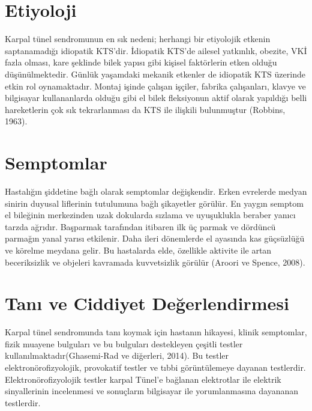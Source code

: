 \documentclass[12pt,twoside]{deuthesis}
\begin{document}
\hypertarget{KTSEtiyoloji}{%
\section{Etiyoloji}\label{KTSEtiyoloji}}

Karpal tünel sendromunun en sık nedeni; herhangi bir etiyolojik etkenin saptanamadığı idiopatik KTS'dir. İdiopatik KTS'de ailesel yatkınlık, obezite, VKİ fazla olması, kare şeklinde bilek yapısı gibi
kişisel faktörlerin etken olduğu düşünülmektedir. Günlük yaşamdaki mekanik etkenler de idiopatik KTS
üzerinde etkin rol oynamaktadır. Montaj işinde çalışan işçiler, fabrika çalışanları, klavye ve bilgisayar
kullananlarda olduğu gibi el bilek fleksiyonun aktif olarak yapıldığı belli hareketlerin çok sık
tekrarlanması da KTS ile ilişkili bulunmuştur (Robbins, 1963).

\hypertarget{KTSSemptom}{%
\section{Semptomlar}\label{KTSSemptom}}

Hastalığın şiddetine bağlı olarak semptomlar değişkendir. Erken evrelerde medyan sinirin duyusal
liflerinin tutulumuna bağlı şikayetler görülür. En yaygın semptom el bileğinin merkezinden uzak
dokularda sızlama ve uyuşuklukla beraber yanıcı tarzda ağrıdır. Başparmak tarafından itibaren ilk üç
parmak ve dördüncü parmağın yanal yarısı etkilenir. Daha ileri dönemlerde el ayasında kas
güçsüzlüğü ve körelme meydana gelir. Bu hastalarda elde, özellikle aktivite ile artan beceriksizlik ve objeleri kavramada kuvvetsizlik görülür (Aroori ve Spence, 2008).

\hypertarget{KTSTani_Ciddi}{%
\section{Tanı ve Ciddiyet Değerlendirmesi}\label{KTSTani_Ciddi}}

Karpal tünel sendromunda tanı koymak için hastanın hikayesi, klinik semptomlar, fizik muayene bulguları ve bu bulguları destekleyen çeşitli testler kullanılmaktadır(Ghasemi-Rad ve diğerleri, 2014).
Bu testler elektronörofizyolojik, provokatif testler ve tıbbi görüntülemeye dayanan testlerdir.
Elektronörofizyolojik testler karpal Tünel'e bağlanan elektrotlar ile elektrik sinyallerinin incelenmesi ve sonuçların bilgisayar ile yorumlanmasına dayananan testlerdir.
\end{document}
